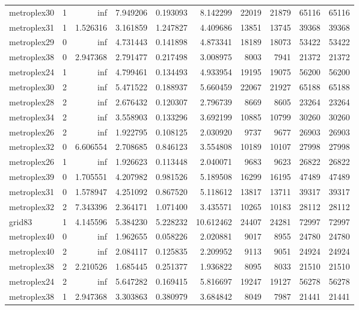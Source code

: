 \begin{longtable}{|l|r|r|r|r|r|r|r|r|r|}
metroplex30 & 1 & inf & 7.949206 & 0.193093 & 8.142299 & 22019 & 21879 & 65116 & 65116 \\
metroplex31 & 1 & 1.526316 & 3.161859 & 1.247827 & 4.409686 & 13851 & 13745 & 39368 & 39368 \\
metroplex29 & 0 & inf & 4.731443 & 0.141898 & 4.873341 & 18189 & 18073 & 53422 & 53422 \\
metroplex38 & 0 & 2.947368 & 2.791477 & 0.217498 & 3.008975 & 8003 & 7941 & 21372 & 21372 \\
metroplex24 & 1 & inf & 4.799461 & 0.134493 & 4.933954 & 19195 & 19075 & 56200 & 56200 \\
metroplex30 & 2 & inf & 5.471522 & 0.188937 & 5.660459 & 22067 & 21927 & 65188 & 65188 \\
metroplex28 & 2 & inf & 2.676432 & 0.120307 & 2.796739 & 8669 & 8605 & 23264 & 23264 \\
metroplex34 & 2 & inf & 3.558903 & 0.133296 & 3.692199 & 10885 & 10799 & 30260 & 30260 \\
metroplex26 & 2 & inf & 1.922795 & 0.108125 & 2.030920 & 9737 & 9677 & 26903 & 26903 \\
metroplex32 & 0 & 6.606554 & 2.708685 & 0.846123 & 3.554808 & 10189 & 10107 & 27998 & 27998 \\
metroplex26 & 1 & inf & 1.926623 & 0.113448 & 2.040071 & 9683 & 9623 & 26822 & 26822 \\
metroplex39 & 0 & 1.705551 & 4.207982 & 0.981526 & 5.189508 & 16299 & 16195 & 47489 & 47489 \\
metroplex31 & 0 & 1.578947 & 4.251092 & 0.867520 & 5.118612 & 13817 & 13711 & 39317 & 39317 \\
metroplex32 & 2 & 7.343396 & 2.364171 & 1.071400 & 3.435571 & 10265 & 10183 & 28112 & 28112 \\
grid83 & 1 & 4.145596 & 5.384230 & 5.228232 & 10.612462 & 24407 & 24281 & 72997 & 72997 \\
metroplex40 & 0 & inf & 1.962655 & 0.058226 & 2.020881 & 9017 & 8955 & 24780 & 24780 \\
metroplex40 & 2 & inf & 2.084117 & 0.125835 & 2.209952 & 9113 & 9051 & 24924 & 24924 \\
metroplex38 & 2 & 2.210526 & 1.685445 & 0.251377 & 1.936822 & 8095 & 8033 & 21510 & 21510 \\
metroplex24 & 2 & inf & 5.647282 & 0.169415 & 5.816697 & 19247 & 19127 & 56278 & 56278 \\
metroplex38 & 1 & 2.947368 & 3.303863 & 0.380979 & 3.684842 & 8049 & 7987 & 21441 & 21441 \\

\end{longtable}
